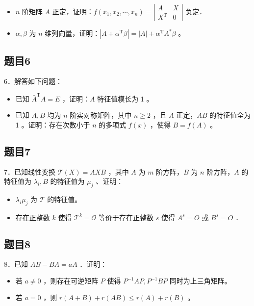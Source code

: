 \documentclass{article}
\begin{document}
\begin{itemize}
  \item[（1）] \(n\) 阶矩阵 \(A\) 正定，证明：\(f\left(x_{1}, x_{2}, \cdots, x_{n}\right)=\left|\begin{array}{cc}A & X \\ X^{\mathrm{T}} & 0\end{array}\right|\) 负定．
  \item[（2）] \(\alpha, \beta\) 为 \(n\) 维列向量，证明：\(\left|A+\alpha^{\mathrm{T}} \beta\right|=|A|+\alpha^{\mathrm{T}} A^{*} \beta\) 。
\end{itemize}

\subsection{题目6}
6．解答如下问题：

\begin{itemize}
  \item[（1）] 已知 \(\bar{A}^{\mathrm{T}} A=E\) ，证明：\(A\) 特征值模长为 1 。
  \item[（2）] 已知 \(A, B\) 均为 \(n\) 阶实对称矩阵，其中 \(n \geq 2\) ，且 \(A\) 正定，\(A B\) 的特征值全为 1 。证明：存在次数小于 \(n\) 的多项式 \(f(x)\) ，使得 \(B=f(A)\) 。
\end{itemize}

\subsection{题目7}
7．已知线性变换 \(\mathcal{T}(X)=A X B\) ，其中 \(A\) 为 \(m\) 阶方阵，\(B\) 为 \(n\) 阶方阵，\(A\) 的特征值为 \(\lambda_{i}, B\) 的特征值为 \(\mu_{j}\) 、证明：

\begin{itemize}
  \item[（1）] \(\lambda_{i} \mu_{j}\) 为 \(\mathcal{T}\) 的特征值。
  \item[（2）] 存在正整数 \(k\) 使得 \(\mathcal{T}^{k}=\mathcal{O}\) 等价于存在正整数 \(s\) 使得 \(A^{s}=O\) 或 \(B^{s}=O\) ．
\end{itemize}

\subsection{题目8}
8．已知 \(A B-B A=a A\) ．证明：

\begin{itemize}
  \item[（1）] 若 \(a \neq 0\) ，则存在可逆矩阵 \(P\) 使得 \(P^{-1} A P, P^{-1} B P\) 同时为上三角矩阵。
  \item[（2）] 若 \(a=0\) ，则 \(r(A+B)+r(A B) \leq r(A)+r(B)\) 。
\end{itemize}
\end{document}
